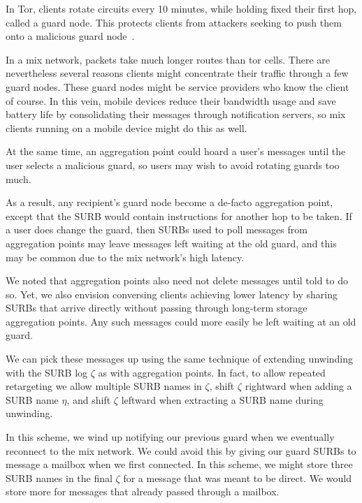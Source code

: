 In Tor, clients rotate circuits every 10 minutes, while holding
fixed their first hop, called a guard node.  This protects clients
from attackers seeking to push them onto a malicious guard
node~\cite{tor-guards}.

In a mix network, packets take much longer routes than tor cells.
There are nevertheless several reasons clients might concentrate
their traffic through a few guard nodes.  These guard nodes might
be service providers who know the client of course.  In this vein,
mobile devices reduce their bandwidth usage and save battery life
by consolidating their messages through notification servers, so mix
clients running on a mobile device might do this as well.

At the same time, an aggregation point could hoard a user's messages
until the user selects a malicious guard, so users may wish to avoid
rotating guards too much.  

As a result, any recipient's guard node become a de-facto aggregation
point, except that the SURB would contain instructions for another hop
to be taken.  If a user does change the guard, then SURBs used to poll
messages from aggregation points may leave messages left waiting at
the old guard, and this may be common due to the mix network's
high latency.

We noted that aggregation points also need not delete messages until
told to do so.  Yet, we also envision conversing clients achieving
lower latency by sharing SURBs that arrive directly without passing
through long-term storage aggregation points.  Any such messages could
more easily be left waiting at an old guard.

We can pick these messages up using the same technique of extending
unwinding with the SURB log $\zeta$ as with aggregation points.  In
fact, to allow repeated retargeting we allow multiple SURB names in
$\zeta$, shift $\zeta$ rightward when adding a SURB name $\eta$, and
shift $\zeta$ leftward when extracting a SURB name during unwinding.

In this scheme, we wind up notifying our previous guard when we
eventually reconnect to the mix network.  We could avoid this by
giving our guard SURBs to message a mailbox when we first connected.
In this scheme, we might store three SURB names in the final $\zeta$
for a message that was meant to be direct.  We would store more for
messages that already passed through a mailbox.



